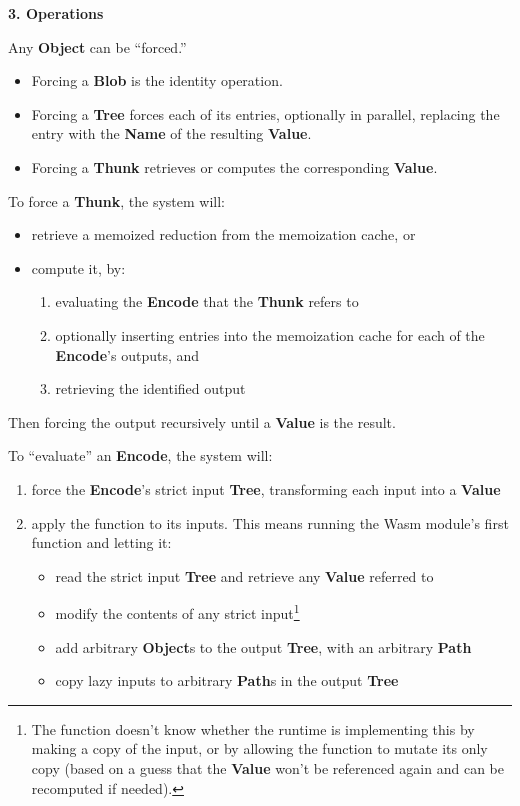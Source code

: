 \documentclass{article}
\newcommand{\blob}{\textbf{Blob}\xspace}
\newcommand{\valuex}{\textbf{Value}\xspace}
\newcommand{\object}{\textbf{Object}\xspace}
\newcommand{\objects}{\textbf{Object}s\xspace}
\newcommand{\encode}{\textbf{Encode}\xspace}
\newcommand{\thunk}{\textbf{Thunk}\xspace}
\newcommand{\name}{\textbf{Name}\xspace}
\newcommand{\tree}{\textbf{Tree}\xspace}
\newcommand{\pathx}{\textbf{Path}\xspace}
\newcommand{\pathxs}{\textbf{Path}s\xspace}
\begin{document}
\vspace{0.5\baselineskip}
{\Large \textbf{3. Operations}}

Any \object can be ``forced.''
\begin{itemize}[topsep=0pt]
\item Forcing a \blob is the identity operation.

\item Forcing a \tree forces each of its entries, optionally in
  parallel, replacing the entry with the \name of the resulting \valuex.

\item Forcing a \thunk retrieves or computes the corresponding \valuex.
\end{itemize}
  
To force a \thunk, the system will:
\begin{itemize}[topsep=0pt]
\item retrieve a memoized reduction from the memoization cache, or
\item compute it, by:
  \begin{enumerate}[topsep=0pt]
  \item evaluating the \encode that the \thunk refers to
  \item optionally inserting entries into the memoization cache for each of the \encode's outputs, and
  \item retrieving the identified output
  \end{enumerate}
\end{itemize}

Then forcing the output recursively until a \valuex is the result.

To ``evaluate'' an \encode, the system will:
\begin{enumerate}[topsep=0pt]
\item force the \encode's strict input \tree, transforming each input into a \valuex
\item apply the function to its inputs. This means running the Wasm module's first function and letting it:
\begin{itemize}[topsep=0pt]
\item read the strict input \tree and retrieve any \valuex referred to
\item modify the contents of any strict input\footnote{The function doesn't
  know whether the runtime is implementing this by making a copy of
  the input, or by allowing the function to mutate its only copy
  (based on a guess that the \valuex won't be referenced again
  and can be recomputed if needed).}
\item add arbitrary \objects to the output \tree, with an arbitrary \pathx
\item copy lazy inputs to arbitrary \pathxs in the output \tree
\end{itemize}
\end{enumerate}
\end{document}
